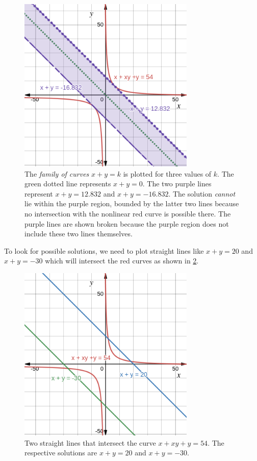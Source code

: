 \documentclass[
  a4paper,
]{article}
\begin{document}
\begin{figure}
\centering
\includegraphics[width=0.75\textwidth,height=\textheight]{images/olympiad-two.png}
\caption{The \emph{family of curves} \(x + y = k\) is plotted for three
values of \(k\). The green dotted line represents \(x + y = 0\). The two
purple lines represent \(x + y = 12.832\) and \(x + y = -16.832\). The
solution \emph{cannot} lie within the purple region, bounded by the
latter two lines because no intersection with the nonlinear red curve is
possible there. The purple lines are shown broken because the purple
region does not include these two lines themselves.}\label{fig:two}
\end{figure}

To look for possible solutions, we need to plot straight lines like
\(x + y = 20\) and \(x + y = -30\) which will intersect the red curves
as shown in \cref{fig:three}.

\begin{figure}
\centering
\includegraphics[width=0.75\textwidth,height=\textheight]{images/olympiad-three.png}
\caption{Two straight lines that intersect the curve
\(x + xy + y = 54\). The respective solutions are \(x + y = 20\) and
\(x + y = -30\).}\label{fig:three}
\end{figure}
\end{document}
